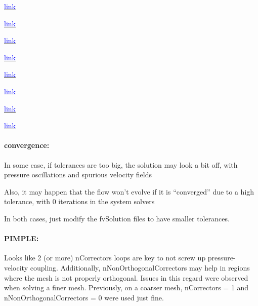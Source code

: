 \documentclass[a4paper, 12pt]{article}
\numberwithin{equation}{section}
\newcommand{\code}{\fontfamily{pcr}\selectfont}
\newcommand{\blue}[1]{\textcolor{blue}{#1}}
\begin{document}
            \href{https://openfoamwiki.net/index.php/OpenFOAM_guide/The_PISO_algorithm_in_OpenFOAM}{\blue{link}}

            \href{https://openfoamwiki.net/index.php/OpenFOAM_guide/The_PIMPLE_algorithm_in_OpenFOAM}{\blue{link}}

            \href{https://www.tfd.chalmers.se/~hani/kurser/OS_CFD_2022/lectureNotes/PIMPLE.pdf}{\blue{link}}

            \href{https://forum.freecad.org/viewtopic.php?style=4&t=31782}{\blue{link}}

            \href{https://doc.cfd.direct/notes/cfd-general-principles/the-pimple-algorithm}{\blue{link}}

            \href{https://doc.cfd.direct/notes/cfd-general-principles/steady-state-solution#x139-18400012}{\blue{link}}

            \href{https://doc.cfd.direct/notes/cfd-general-principles/transient-solution#x150-19700019}{\blue{link}}

            \href{https://www.simscale.com/forum/t/cfd-pimple-algorithm/81418}{\blue{link}}

        \paragraph{convergence:\\}
            In some case, if tolerances are too big, the solution may look a bit off, with pressure oscillations and spurious velocity fields

            Also, it may happen that the flow won't evolve if it is ``converged'' due to a high tolerance, with 0 iterations in the system solvers

            In both cases, just modify the {\code fvSolution} files to have smaller tolerances.

        \paragraph{PIMPLE:\\}

            Looks like 2 (or more) {\code nCorrectors} loops are key to not screw up pressure-velocity coupling. Additionally, {\code nNonOrthogonalCorrectors} may help in regions where the mesh is not properly orthogonal. Issues in this regard were observed when solving a finer mesh. Previously, on a coarser mesh, {\code nCorrectors = 1} and {\code nNonOrthogonalCorrectors = 0} were used just fine.
\end{document}
